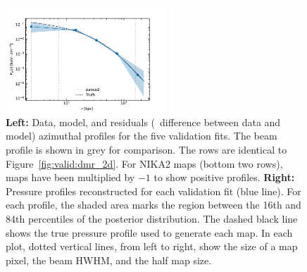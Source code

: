 \begin{figure}[t]
    \includegraphics[height=4cm, trim={0 0 1cm 0.5cm}, clip]{../validation/results/C3/NIKA2/pressure_profile.pdf}
    \caption{
        \textbf{Left:} Data, model, and residuals (\ie\ difference between data and model) azimuthal profiles for the five validation fits.
        The beam profile is shown in grey for comparison.
        The rows are identical to Figure~\ref{fig:valid:dmr_2d}.
        For NIKA2 maps (bottom two rows), maps have been multiplied by $-1$ to show positive profiles.
        \textbf{Right:} Pressure profiles reconstructed for each validation fit (blue line).
        For each profile, the shaded area marks the region between the 16th and 84th percentiles of the posterior distribution.
        The dashed black line shows the true pressure profile used to generate each map.
        In each plot, dotted vertical lines, from left to right, show the size of a map pixel, the beam HWHM, and the half map size.
    }
    \label{fig:valid:profiles}
\end{figure}
